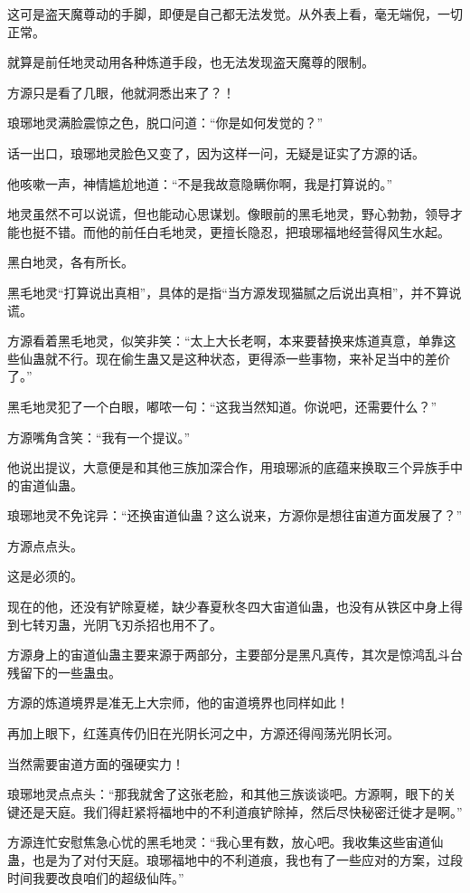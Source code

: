 \begin{this_body}
这可是盗天魔尊动的手脚，即便是自己都无法发觉。从外表上看，毫无端倪，一切正常。

就算是前任地灵动用各种炼道手段，也无法发现盗天魔尊的限制。

方源只是看了几眼，他就洞悉出来了？！

琅琊地灵满脸震惊之色，脱口问道：“你是如何发觉的？”

话一出口，琅琊地灵脸色又变了，因为这样一问，无疑是证实了方源的话。

他咳嗽一声，神情尴尬地道：“不是我故意隐瞒你啊，我是打算说的。”

地灵虽然不可以说谎，但也能动心思谋划。像眼前的黑毛地灵，野心勃勃，领导才能也挺不错。而他的前任白毛地灵，更擅长隐忍，把琅琊福地经营得风生水起。

黑白地灵，各有所长。

黑毛地灵“打算说出真相”，具体的是指“当方源发现猫腻之后说出真相”，并不算说谎。

方源看着黑毛地灵，似笑非笑：“太上大长老啊，本来要替换来炼道真意，单靠这些仙蛊就不行。现在偷生蛊又是这种状态，更得添一些事物，来补足当中的差价了。”

黑毛地灵犯了一个白眼，嘟哝一句：“这我当然知道。你说吧，还需要什么？”

方源嘴角含笑：“我有一个提议。”

他说出提议，大意便是和其他三族加深合作，用琅琊派的底蕴来换取三个异族手中的宙道仙蛊。

琅琊地灵不免诧异：“还换宙道仙蛊？这么说来，方源你是想往宙道方面发展了？”

方源点点头。

这是必须的。

现在的他，还没有铲除夏槎，缺少春夏秋冬四大宙道仙蛊，也没有从铁区中身上得到七转刃蛊，光阴飞刃杀招也用不了。

方源身上的宙道仙蛊主要来源于两部分，主要部分是黑凡真传，其次是惊鸿乱斗台残留下的一些蛊虫。

方源的炼道境界是准无上大宗师，他的宙道境界也同样如此！

再加上眼下，红莲真传仍旧在光阴长河之中，方源还得闯荡光阴长河。

当然需要宙道方面的强硬实力！

琅琊地灵点点头：“那我就舍了这张老脸，和其他三族谈谈吧。方源啊，眼下的关键还是天庭。我们得赶紧将福地中的不利道痕铲除掉，然后尽快秘密迁徙才是啊。”

方源连忙安慰焦急心忧的黑毛地灵：“我心里有数，放心吧。我收集这些宙道仙蛊，也是为了对付天庭。琅琊福地中的不利道痕，我也有了一些应对的方案，过段时间我要改良咱们的超级仙阵。”


\end{this_body}
